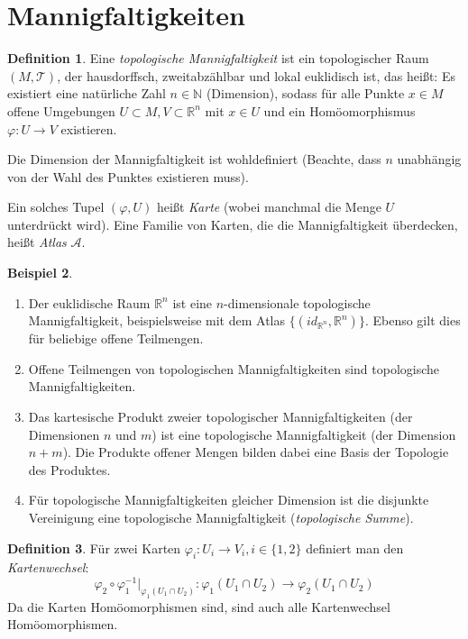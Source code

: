 \documentclass[a4paper]{scrreprt}
\numberwithin{equation}{chapter}
\newcommand{\R}{\mathbb{R}}
\theoremstyle{definition}
\newtheorem{defn}{Definition}[section]
\newtheorem{bsp}[defn]{Beispiel}
\begin{document}
	\section{Mannigfaltigkeiten}
		\begin{defn}
			Eine \emph{topologische Mannigfaltigkeit} ist ein topologischer Raum $(M,\mathcal{T})$, der hausdorffsch, zweitabzählbar und lokal euklidisch ist, das heißt:
			Es existiert eine natürliche Zahl $n\in \mathbb{N}$ (Dimension), sodass für alle Punkte $x\in M$ offene Umgebungen $U\subset M, V\subset \R^n$ mit $x\in U $ und ein Homöomorphismus $ \varphi\colon U\rightarrow V$ existieren.

			Die Dimension der Mannigfaltigkeit ist wohldefiniert (Beachte, dass $n$ unabhängig von der Wahl des Punktes existieren muss).

			Ein solches Tupel $(\varphi,U)$ heißt \emph{Karte} (wobei manchmal die Menge $U$ unterdrückt wird). Eine Familie von Karten, die die Mannigfaltigkeit überdecken, heißt \emph{Atlas} $\mathcal{A}$.
		\end{defn}
		\begin{bsp}\hfill 
			\begin{enumerate}
				\item Der euklidische Raum $\R^n$ ist eine $n$-dimensionale topologische Mannigfaltigkeit, beispielsweise mit dem Atlas $\lbrace (id_{\R^n},\R^n)\rbrace$. Ebenso gilt dies für beliebige offene Teilmengen.
				\item Offene Teilmengen von topologischen Mannigfaltigkeiten sind topologische Mannigfaltigkeiten.
				\item Das kartesische Produkt zweier topologischer Mannigfaltigkeiten (der Dimensionen $n$ und $m$) ist eine topologische Mannigfaltigkeit (der Dimension $n + m$). Die Produkte offener Mengen bilden dabei eine Basis der Topologie des Produktes.
				\item Für topologische Mannigfaltigkeiten gleicher Dimension ist die disjunkte Vereinigung eine topologische Mannigfaltigkeit (\emph{topologische Summe}).
			\end{enumerate}
		\end{bsp}
		\begin{defn}
			Für zwei Karten $\varphi_i\colon U_i\rightarrow V_i, i\in\lbrace 1,2 \rbrace$ definiert man den \emph{Kartenwechsel}:
			\begin{equation*}
				\varphi_2\circ\varphi_1^{-1}\vert_{\varphi_1(U_1\cap U_2)}\colon \varphi_1(U_1\cap U_2)\rightarrow \varphi_2(U_1\cap U_2)
			\end{equation*}
			Da die Karten Homöomorphismen sind, sind auch alle Kartenwechsel Homöomorphismen.
		\end{defn} 
\end{document}
